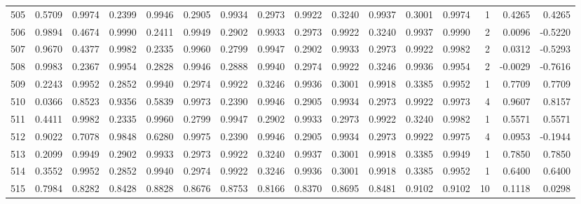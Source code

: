 \begin{tabular}{lrrrrrrrrrrrrrrr}
505 &      0.5709 &  0.9974 &  0.2399 &  0.9946 &  0.2905 &  0.9934 &  0.2973 &  0.9922 &  0.3240 &  0.9937 &   0.3001 &     0.9974 &      1 &                    0.4265 &                     0.4265 \\
506 &      0.9894 &  0.4674 &  0.9990 &  0.2411 &  0.9949 &  0.2902 &  0.9933 &  0.2973 &  0.9922 &  0.3240 &   0.9937 &     0.9990 &      2 &                    0.0096 &                    -0.5220 \\
507 &      0.9670 &  0.4377 &  0.9982 &  0.2335 &  0.9960 &  0.2799 &  0.9947 &  0.2902 &  0.9933 &  0.2973 &   0.9922 &     0.9982 &      2 &                    0.0312 &                    -0.5293 \\
508 &      0.9983 &  0.2367 &  0.9954 &  0.2828 &  0.9946 &  0.2888 &  0.9940 &  0.2974 &  0.9922 &  0.3246 &   0.9936 &     0.9954 &      2 &                   -0.0029 &                    -0.7616 \\
509 &      0.2243 &  0.9952 &  0.2852 &  0.9940 &  0.2974 &  0.9922 &  0.3246 &  0.9936 &  0.3001 &  0.9918 &   0.3385 &     0.9952 &      1 &                    0.7709 &                     0.7709 \\
510 &      0.0366 &  0.8523 &  0.9356 &  0.5839 &  0.9973 &  0.2390 &  0.9946 &  0.2905 &  0.9934 &  0.2973 &   0.9922 &     0.9973 &      4 &                    0.9607 &                     0.8157 \\
511 &      0.4411 &  0.9982 &  0.2335 &  0.9960 &  0.2799 &  0.9947 &  0.2902 &  0.9933 &  0.2973 &  0.9922 &   0.3240 &     0.9982 &      1 &                    0.5571 &                     0.5571 \\
512 &      0.9022 &  0.7078 &  0.9848 &  0.6280 &  0.9975 &  0.2390 &  0.9946 &  0.2905 &  0.9934 &  0.2973 &   0.9922 &     0.9975 &      4 &                    0.0953 &                    -0.1944 \\
513 &      0.2099 &  0.9949 &  0.2902 &  0.9933 &  0.2973 &  0.9922 &  0.3240 &  0.9937 &  0.3001 &  0.9918 &   0.3385 &     0.9949 &      1 &                    0.7850 &                     0.7850 \\
514 &      0.3552 &  0.9952 &  0.2852 &  0.9940 &  0.2974 &  0.9922 &  0.3246 &  0.9936 &  0.3001 &  0.9918 &   0.3385 &     0.9952 &      1 &                    0.6400 &                     0.6400 \\
515 &      0.7984 &  0.8282 &  0.8428 &  0.8828 &  0.8676 &  0.8753 &  0.8166 &  0.8370 &  0.8695 &  0.8481 &   0.9102 &     0.9102 &     10 &                    0.1118 &                     0.0298 \\

\end{tabular}
